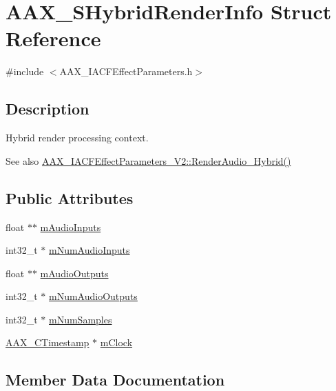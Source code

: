 \hypertarget{a00121}{}\section{A\+A\+X\+\_\+\+S\+Hybrid\+Render\+Info Struct Reference}
\label{a00121}


{\ttfamily \#include $<$A\+A\+X\+\_\+\+I\+A\+C\+F\+Effect\+Parameters.\+h$>$}



\subsection{Description}
Hybrid render processing context. 

\begin{DoxySeeAlso}{See also}
\hyperlink{a00335_gae6139041de22f51f3146d26a01c54c1b}{A\+A\+X\+\_\+\+I\+A\+C\+F\+Effect\+Parameters\+\_\+\+V2\+::\+Render\+Audio\+\_\+\+Hybrid()} 
\end{DoxySeeAlso}
\subsection*{Public Attributes}
\begin{DoxyCompactItemize}
\item 
float $\ast$$\ast$ \hyperlink{a00121_aa1c8e11d2520d947d2d5a9a6df749010}{m\+Audio\+Inputs}
\item 
int32\+\_\+t $\ast$ \hyperlink{a00121_a92940f656974c46e74f4e4dfb7853b05}{m\+Num\+Audio\+Inputs}
\item 
float $\ast$$\ast$ \hyperlink{a00121_a170d77de5fcef4fdbd80ba215c9df149}{m\+Audio\+Outputs}
\item 
int32\+\_\+t $\ast$ \hyperlink{a00121_a512b8e935b80452a74c8b39bcb53bf6e}{m\+Num\+Audio\+Outputs}
\item 
int32\+\_\+t $\ast$ \hyperlink{a00121_a57a29e2772721e1c9276b9114dc212a2}{m\+Num\+Samples}
\item 
\hyperlink{a00149_aae7325dbfa53a983f208a68cb563fba5}{A\+A\+X\+\_\+\+C\+Timestamp} $\ast$ \hyperlink{a00121_ad98d7a8b5a0cfee06b31a81fe9ebe7fb}{m\+Clock}
\end{DoxyCompactItemize}


\subsection{Member Data Documentation}
\hypertarget{a00121_aa1c8e11d2520d947d2d5a9a6df749010}{}
